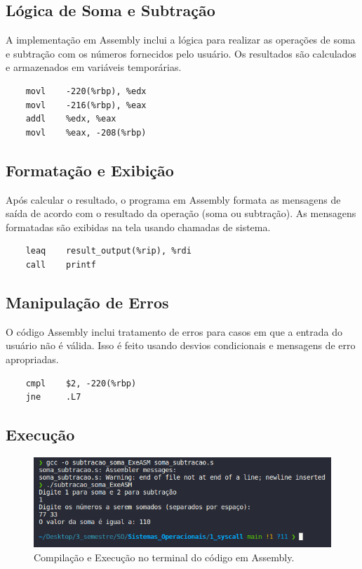 \documentclass[
	12pt,				%
	openright,			%
	oneside,			%
	a4paper,			%
	chapter=TITLE,		%
	english,			%
	french,				%
	spanish,			%
	brazil				%
	]{abntex2}
\theoremstyle{definition}
\begin{document}
\subsection{Lógica de Soma e Subtração}

A implementação em Assembly inclui a lógica para realizar as operações de soma e 
subtração com os números fornecidos pelo usuário. Os resultados são calculados e 
armazenados em variáveis temporárias.

\begin{verbatim}
    movl    -220(%rbp), %edx
    movl    -216(%rbp), %eax
    addl    %edx, %eax
    movl    %eax, -208(%rbp)
\end{verbatim}

\subsection{Formatação e Exibição}

Após calcular o resultado, o programa em Assembly formata as mensagens de saída de acordo 
com o resultado da operação (soma ou subtração). As mensagens formatadas são exibidas na 
tela usando chamadas de sistema.

\begin{verbatim}
    leaq    result_output(%rip), %rdi
    call    printf
\end{verbatim}

\subsection{Manipulação de Erros}

O código Assembly inclui tratamento de erros para casos em que a entrada do usuário não é 
válida. Isso é feito usando desvios condicionais e mensagens de erro apropriadas.

\begin{verbatim}
    cmpl    $2, -220(%rbp)
    jne     .L7
\end{verbatim}

\subsection{Execução}

\begin{figure} %
    \centering
    \includegraphics[width=1.0\textwidth]{imagens/run_asm.png}
	\caption{Compilação e Execução no terminal do código em Assembly.}
	\label{fig:run_asm}
\end{figure}
\end{document}
